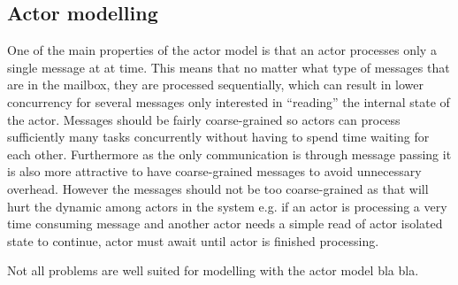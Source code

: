 \subsection{Actor modelling}
One of the main properties of the actor model is that an actor processes only a single message at at time. This means that no matter what type of messages that are in the mailbox, they are processed sequentially, which can result in lower concurrency for several messages only interested in ``reading'' the internal state of the actor. Messages should be fairly coarse-grained so actors can process sufficiently many tasks concurrently without having to spend time waiting for each other\cite[p. 269]{karmani2009actor}. Furthermore as the only communication is through message passing it is also more attractive to have coarse-grained messages to avoid unnecessary overhead. However the messages should not be too coarse-grained as that will hurt the dynamic among actors in the system e.g. if an actor  is processing a very time consuming message and another actor  needs a simple read of actor  isolated state to continue, actor  must await until actor  is finished processing.






Not all problems are well suited for modelling with the actor model bla bla.








